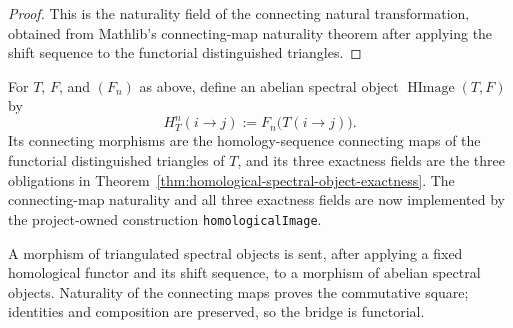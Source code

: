 \begin{proof}
  \leanok
  This is the naturality field of the connecting natural transformation,
  obtained from Mathlib's connecting-map naturality theorem after applying the
  shift sequence to the functorial distinguished triangles.
\end{proof}

\begin{definition}
  \label{def:homological-image-abelian-spectral-object}
  \leanok
  For $T$, $F$, and $(F_n)$ as above, define an abelian spectral object
  $\operatorname{HImage}(T,F)$ by
  \[
    H^n_T(i\to j):=F_n\bigl(T(i\to j)\bigr).
  \]
  Its connecting morphisms are the homology-sequence connecting maps of the
  functorial distinguished triangles of $T$, and its three exactness fields are
  the three obligations in
  Theorem~\ref{thm:homological-spectral-object-exactness}.  The connecting-map
  naturality and all three exactness fields are now implemented by the
  project-owned construction \texttt{homologicalImage}.
\end{definition}

\begin{definition}
  \label{def:homological-image-functoriality}
  \leanok
  A morphism of triangulated spectral objects is sent, after applying a fixed
  homological functor and its shift sequence, to a morphism of abelian spectral
  objects.  Naturality of the connecting maps proves the commutative square;
  identities and composition are preserved, so the bridge is functorial.
\end{definition}

